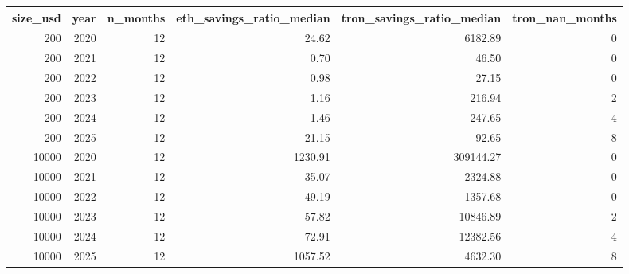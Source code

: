 \begin{tabular}{rrrrrr}
\toprule
size_usd & year & n_months & eth_savings_ratio_median & tron_savings_ratio_median & tron_nan_months \\
\midrule
200 & 2020 & 12 & 24.62 & 6182.89 & 0 \\
200 & 2021 & 12 & 0.70 & 46.50 & 0 \\
200 & 2022 & 12 & 0.98 & 27.15 & 0 \\
200 & 2023 & 12 & 1.16 & 216.94 & 2 \\
200 & 2024 & 12 & 1.46 & 247.65 & 4 \\
200 & 2025 & 12 & 21.15 & 92.65 & 8 \\
10000 & 2020 & 12 & 1230.91 & 309144.27 & 0 \\
10000 & 2021 & 12 & 35.07 & 2324.88 & 0 \\
10000 & 2022 & 12 & 49.19 & 1357.68 & 0 \\
10000 & 2023 & 12 & 57.82 & 10846.89 & 2 \\
10000 & 2024 & 12 & 72.91 & 12382.56 & 4 \\
10000 & 2025 & 12 & 1057.52 & 4632.30 & 8 \\
\bottomrule
\end{tabular}
